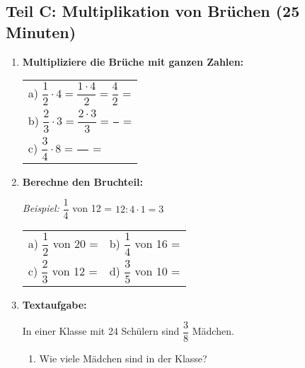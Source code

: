 \subsection*{Teil C: Multiplikation von Brüchen (25 Minuten)}

\begin{enumerate}[resume, label=\arabic*.]
    \item \textbf{Multipliziere die Brüche mit ganzen Zahlen:}

    \vspace{0.5cm}
    \begin{tabular}{l}
        a) $\dfrac{1}{2} \cdot 4 = \dfrac{1 \cdot 4}{2} = \dfrac{4}{2}$ = \underline{\hspace{3cm}} \\[3ex]
        b) $\dfrac{2}{3} \cdot 3 = \dfrac{2 \cdot 3}{3} = \dfrac{\phantom{5}}{\phantom{5}}$ = \underline{\hspace{3cm}} \\[3ex]
        c) $\dfrac{3}{4} \cdot 8 = \dfrac{\phantom{24}}{\phantom{4}}$ = \underline{\hspace{3cm}}
    \end{tabular}

    \vspace{1cm}

    \item \textbf{Berechne den Bruchteil:}

    \textit{Beispiel:} $\dfrac{1}{4}$ von 12 = $12 : 4 \cdot 1 = 3$

    \vspace{0.5cm}
    \begin{tabular}{ll}
        a) $\dfrac{1}{2}$ von 20 = \underline{\hspace{3cm}} & 
        b) $\dfrac{1}{4}$ von 16 = \underline{\hspace{3cm}} \\[2ex]
        c) $\dfrac{2}{3}$ von 12 = \underline{\hspace{3cm}} & 
        d) $\dfrac{3}{5}$ von 10 = \underline{\hspace{3cm}}
    \end{tabular}

    \vspace{1cm}

    \item \textbf{Textaufgabe:} 

    In einer Klasse mit 24 Schülern sind $\dfrac{3}{8}$ Mädchen.

    \begin{enumerate}[label=\alph*)]
        \item Wie viele Mädchen sind in der Klasse?


\end{enumerate}
\end{enumerate}
